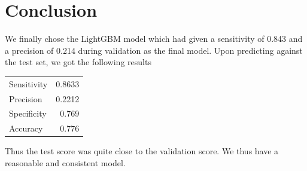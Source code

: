 \documentclass[conference]{IEEEtran}
\begin{document}
\section{Conclusion}
We finally chose the LightGBM model which had given a sensitivity of 0.843 and
a precision of 0.214 during validation as the final model. Upon predicting
against the test set, we got the following results

\smallskip
\begin{center}
\begin{tabular}{ |l|r| }
 \hline
 Sensitivity & 0.8633 \\
 Precision & 0.2212 \\
 Specificity & 0.769 \\
 Accuracy & 0.776 \\
 \hline
\end{tabular}
\end{center}

Thus the test score was quite close to the validation score. We thus have a
reasonable and consistent model.
\end{document}
